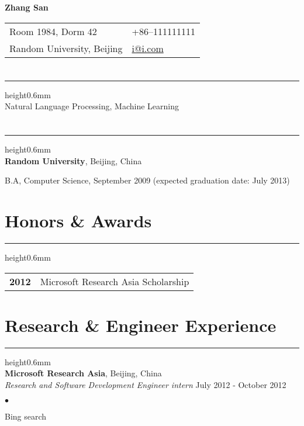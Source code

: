 \documentclass[9pt]{res}
\newcommand*\varhrulefill[1][0.4pt]{\leavevmode\leaders\hrule height#1\hfill\kern0pt}
\newenvironment{list1}{
  \begin{list}{\ding{113}}{%
      \setlength{\itemsep}{0in}
      \setlength{\parsep}{0in} \setlength{\parskip}{0in}
      \setlength{\topsep}{0in} \setlength{\partopsep}{0in} 
      \setlength{\leftmargin}{0.20in}}}{\end{list}}
\newenvironment{list2}{
  \begin{list}{$\bullet$}{%
      \setlength{\itemsep}{0in}
      \setlength{\parsep}{0in} \setlength{\parskip}{0in}
      \setlength{\topsep}{0in} \setlength{\partopsep}{0in} 
      \setlength{\leftmargin}{0.2in}}}{\end{list}}
\begin{document}
{\LARGE \textbf{Zhang San}\vspace*{.07in}}\\
\begin{tabular}{@{}p{5.8in}p{4.5in}}
Room 1984, Dorm 42   & +86--111111111\\         
Random University, Beijing & \href{mailto:i@i.com}{i@i.com}\\       
\end{tabular}

\begin{resume}

\section{\large \color{light-gray}{Research Interests} }
\noindent\varhrulefill[0.6mm] \vspace{1mm}\\
{Natural Language Processing, Machine Learning}

\section{\large \color{light-gray}{Education}}
\noindent\varhrulefill[0.6mm] \vspace{1mm}\\
{\bf Random University}, Beijing, China\\
\vspace*{-.1in}
\begin{list1}
\item[] B.A,  Computer Science, September 2009 (expected graduation date: July 2013)
\end{list1}

\section{\large \color{light-gray} Honors \& Awards}
\noindent\varhrulefill[0.6mm] \vspace{1mm}\\
\begin{tabular}{@{}p{.3in}p{7.1in}}
{\bf 2012} & Microsoft Research Asia Scholarship\\ [.5ex]
\end{tabular}

\section{\large \color{light-gray} Research \& Engineer Experience}
\noindent\varhrulefill[0.6mm] \vspace{1mm}\\
{\bf \color{light-gray} Microsoft Research Asia}, Beijing, China\\
\vspace{-.3cm}
{\em Research and Software Development Engineer intern} \hfill {July 2012 - October 2012}\\
\begin{list2}
\item{Bing search}
\end{list2}


\end{resume}
\end{document}
